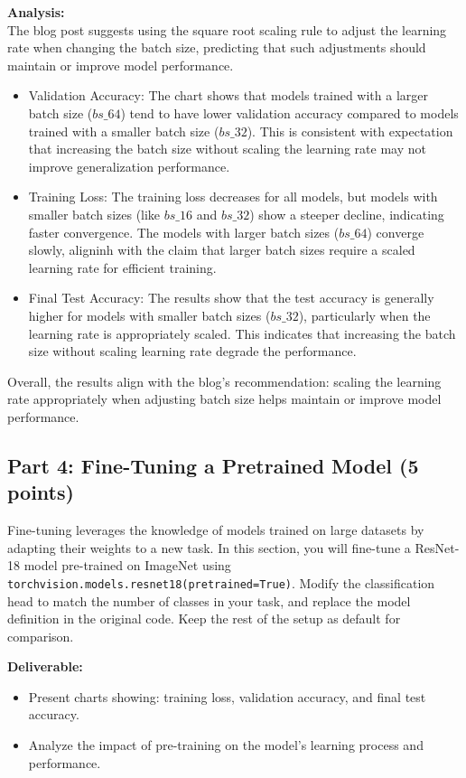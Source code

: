 \documentclass[11pt, oneside]{article}   	%
\begin{document}
\textbf{Analysis: }
\\
The blog post suggests using the square root scaling rule to adjust the learning rate when changing the batch size, predicting that such adjustments should maintain or improve model performance.
\\
\begin{itemize}
    \item Validation Accuracy: The chart shows that models trained with a larger batch size ($bs\_64$) tend to have lower validation accuracy compared to models trained with a smaller batch size ($bs\_32$). This is consistent with expectation that increasing the batch size without scaling the learning rate may not improve generalization performance.
    \item Training Loss: The training loss decreases for all models, but models with smaller batch sizes (like $bs\_16$ and $bs\_32$) show a steeper decline, indicating faster convergence. The models with larger batch sizes ($bs\_64$) converge slowly, aligninh with the claim that larger batch sizes require a scaled learning rate for efficient training.
    \item Final Test Accuracy: The results show that the test accuracy is generally higher for models with smaller batch sizes ($bs\_32$), particularly when the learning rate is appropriately scaled. This indicates that increasing the batch size without scaling learning rate degrade the performance.
\end{itemize}
Overall, the results align with the blog's recommendation: scaling the learning rate appropriately when adjusting batch size helps maintain or improve model performance.

\subsection*{Part 4: Fine-Tuning a Pretrained Model (5 points)}
Fine-tuning leverages the knowledge of models trained on large datasets by adapting their weights to a new task. In this section, you will fine-tune a ResNet-18 model pre-trained on ImageNet using \texttt{torchvision.models.resnet18(pretrained=True)}. Modify the classification head to match the number of classes in your task, and replace the model definition in the original code. Keep the rest of the setup as default for comparison.


\noindent\textbf{Deliverable:}
\begin{itemize}
    \item Present charts showing: training loss, validation accuracy, and final test accuracy.
    \item Analyze the impact of pre-training on the model's learning process and performance.
\end{itemize}
\end{document}

